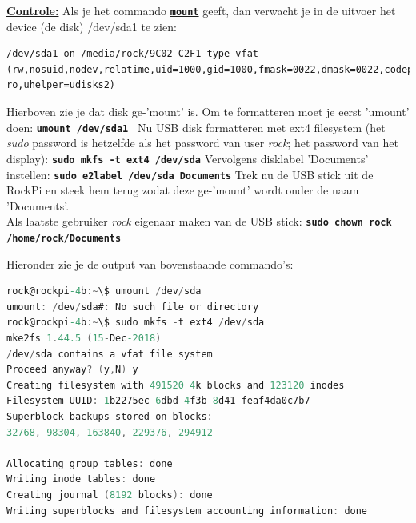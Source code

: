 \underline{\textbf{Controle:}}\newline 
Als je het commando \href{https://www.techrepublic.com/article/linux-101-what-is-the-mount-command-and-how-do-you-use-it/}{\textbf{\texttt{mount}}} geeft, dan verwacht je in de uitvoer het device (de disk) /dev/sda1 te zien: %
\begin{lstlisting}
/dev/sda1 on /media/rock/9C02-C2F1 type vfat (rw,nosuid,nodev,relatime,uid=1000,gid=1000,fmask=0022,dmask=0022,codepage=936,iocharset=utf8,shortname=mixed,showexec,utf8,flush,errors=remount-ro,uhelper=udisks2)
\end{lstlisting}

Hierboven zie je dat disk ge-'mount' is. Om te formatteren moet je eerst 'umount' doen:\newline
\textbf{\texttt{umount /dev/sda1 }}\newline
Nu USB disk formatteren met ext4 filesystem (het \textit{sudo} password is hetzelfde als het password van user \textit{rock}; het password van het display):\newline
\textbf{\texttt{sudo mkfs -t ext4 /dev/sda}}\newline
Vervolgens disklabel 'Documents' instellen:\newline
\textbf{\texttt{sudo e2label /dev/sda Documents}}\newline
Trek nu de USB stick uit de RockPi en steek hem terug zodat deze ge-'mount' wordt onder de naam 'Documents'.\\
Als laatste gebruiker \textit{rock} eigenaar maken van de USB stick:\newline
\textbf{\texttt{sudo chown rock /home/rock/Documents}}\newline

Hieronder zie je de output van bovenstaande commando's:
	
\begin{lstlisting}[language=C]   % Gert: Is het niet, maar hiermee doet hij geen speciale opmaak
rock@rockpi-4b:~\$ umount /dev/sda
umount: /dev/sda#: No such file or directory
rock@rockpi-4b:~\$ sudo mkfs -t ext4 /dev/sda
mke2fs 1.44.5 (15-Dec-2018)
/dev/sda contains a vfat file system
Proceed anyway? (y,N) y
Creating filesystem with 491520 4k blocks and 123120 inodes
Filesystem UUID: 1b2275ec-6dbd-4f3b-8d41-feaf4da0c7b7
Superblock backups stored on blocks:
32768, 98304, 163840, 229376, 294912

Allocating group tables: done
Writing inode tables: done
Creating journal (8192 blocks): done
Writing superblocks and filesystem accounting information: done
\end{lstlisting}

